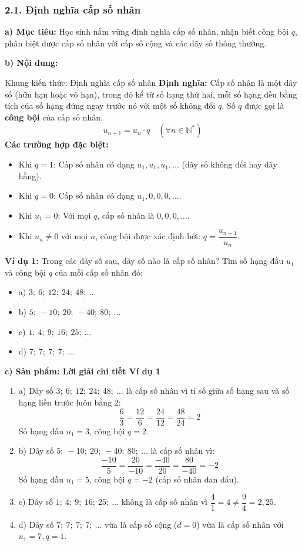\documentclass[12pt, a4paper]{article}
\begin{document}
\subsubsection*{2.1. Định nghĩa cấp số nhân}

\noindent \textbf{a) Mục tiêu:}
Học sinh nắm vững định nghĩa cấp số nhân, nhận biết công bội $q$, phân biệt được cấp số nhân với cấp số cộng và các dãy số thông thường.

\noindent \textbf{b) Nội dung:}
\begin{pedabox}{Khung kiến thức: Định nghĩa cấp số nhân}
\textbf{Định nghĩa:} Cấp số nhân là một dãy số (hữu hạn hoặc vô hạn), trong đó kể từ số hạng thứ hai, mỗi số hạng đều bằng tích của số hạng đứng ngay trước nó với một số không đổi $q$. Số $q$ được gọi là \textbf{công bội} của cấp số nhân.
$$u_{n+1} = u_n \cdot q \quad (\forall n \in \mathbb{N}^*)$$
\textbf{Các trường hợp đặc biệt:}
\begin{itemize}[leftmargin=0.6cm]
    \item Khi $q = 1$: Cấp số nhân có dạng $u_1, u_1, u_1, \dots$ (dãy số không đổi hay dãy hằng).
    \item Khi $q = 0$: Cấp số nhân có dạng $u_1, 0, 0, 0, \dots$.
    \item Khi $u_1 = 0$: Với mọi $q$, cấp số nhân là $0, 0, 0, \dots$.
    \item Khi $u_n \neq 0$ với mọi $n$, công bội được xác định bởi: $q = \dfrac{u_{n+1}}{u_n}$.
\end{itemize}
\end{pedabox}

\textbf{Ví dụ 1:} Trong các dãy số sau, dãy số nào là cấp số nhân? Tìm số hạng đầu $u_1$ và công bội $q$ của mỗi cấp số nhân đó:
\begin{itemize}[leftmargin=0.6cm]
    \item a) $3; \ 6; \ 12; \ 24; \ 48; \ \dots$
    \item b) $5; \ -10; \ 20; \ -40; \ 80; \ \dots$
    \item c) $1; \ 4; \ 9; \ 16; \ 25; \ \dots$
    \item d) $7; \ 7; \ 7; \ 7; \ \dots$
\end{itemize}

\noindent \textbf{c) Sản phẩm: Lời giải chi tiết Ví dụ 1}
\begin{enumerate}[leftmargin=0.6cm]
    \item a) Dãy số $3; \ 6; \ 12; \ 24; \ 48; \ \dots$ là cấp số nhân vì tỉ số giữa số hạng sau và số hạng liền trước luôn bằng $2$:
    $$\dfrac{6}{3} = \dfrac{12}{6} = \dfrac{24}{12} = \dfrac{48}{24} = 2$$
    Số hạng đầu $u_1 = 3$, công bội $q = 2$.
    \item b) Dãy số $5; \ -10; \ 20; \ -40; \ 80; \ \dots$ là cấp số nhân vì:
    $$\dfrac{-10}{5} = \dfrac{20}{-10} = \dfrac{-40}{20} = \dfrac{80}{-40} = -2$$
    Số hạng đầu $u_1 = 5$, công bội $q = -2$ (cấp số nhân đan dấu).
    \item c) Dãy số $1; \ 4; \ 9; \ 16; \ 25; \ \dots$ không là cấp số nhân vì $\dfrac{4}{1} = 4 \neq \dfrac{9}{4} = 2{,}25$.
    \item d) Dãy số $7; \ 7; \ 7; \ 7; \ \dots$ vừa là cấp số cộng ($d = 0$) vừa là cấp số nhân với $u_1 = 7, q = 1$.
\end{enumerate}
\end{document}
